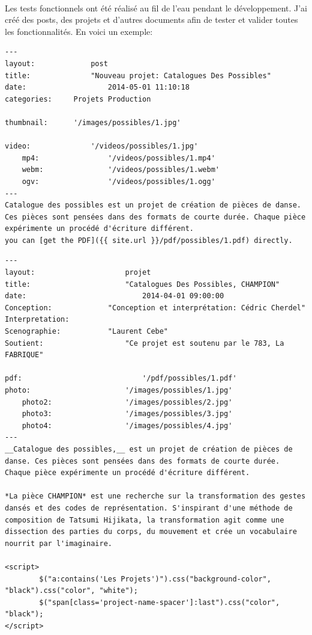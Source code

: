 \documentclass[11pt,a4paper]{report}
\begin{document}
			\paragraph*{}Les tests fonctionnels ont été réalisé au fil de l'eau pendant le développement. J'ai créé des posts, des projets et d'autres documents afin de tester et valider toutes les fonctionnalités. En voici un exemple:
			
			\lstset{caption=fichier Markdown d'un post}
			\begin{lstlisting}
---
layout:				post
title:				"Nouveau projet: Catalogues Des Possibles"
date:					2014-05-01 11:10:18
categories:		Projets Production

thumbnail:		'/images/possibles/1.jpg'

video:				'/videos/possibles/1.jpg'
	mp4:				'/videos/possibles/1.mp4'
	webm:				'/videos/possibles/1.webm'
	ogv:				'/videos/possibles/1.ogg'
---
Catalogue des possibles est un projet de création de pièces de danse. Ces pièces sont pensées dans des formats de courte durée. Chaque pièce expérimente un procédé d'écriture différent.
you can [get the PDF]({{ site.url }}/pdf/possibles/1.pdf) directly.
			\end{lstlisting}

			\lstset{caption=fichier Markdown d'un projet}
			\begin{lstlisting}
---
layout:						projet
title:						"Catalogues Des Possibles, CHAMPION"
date:							2014-04-01 09:00:00
Conception:				"Conception et interprétation: Cédric Cherdel"
Interpretation:     
Scenographie:			"Laurent Cebe"
Soutient:					"Ce projet est soutenu par le 783, La FABRIQUE"

pdf:							'/pdf/possibles/1.pdf'
photo:						'/images/possibles/1.jpg'
	photo2:					'/images/possibles/2.jpg'
	photo3:					'/images/possibles/3.jpg'
	photo4:					'/images/possibles/4.jpg'
---
__Catalogue des possibles,__ est un projet de création de pièces de danse. Ces pièces sont pensées dans des formats de courte durée. Chaque pièce expérimente un procédé d'écriture différent.

*La pièce CHAMPION* est une recherche sur la transformation des gestes dansés et des codes de représentation. S'inspirant d'une méthode de composition de Tatsumi Hijikata, la transformation agit comme une dissection des parties du corps, du mouvement et crée un vocabulaire nourrit par l'imaginaire.

<script>
		$("a:contains('Les Projets')").css("background-color", "black").css("color", "white");
		$("span[class='project-name-spacer']:last").css("color", "black");
</script>
			 \end{lstlisting}			 
\end{document}

